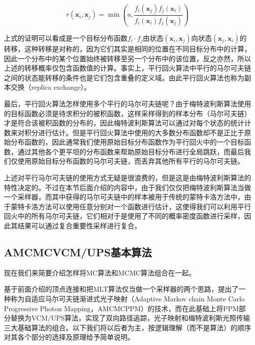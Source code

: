\begin{equation}
	r(\mathbf{x}_i,\mathbf{x}_j)=\min(a,\frac{f_i(\mathbf{x}_j)f_j(\mathbf{x}_i)}{f_i(\mathbf{x}_i)f_j(\mathbf{x}_j)})
\end{equation}

\noindent 上式的证明可以看成是一个目标分布函数$f_i\cdot f_j$由状态$(\mathbf{x}_i,\mathbf{x}_j)$向状态$(\mathbf{x}_j,\mathbf{x}_i)$的转移，这种转移是对称的，因为它们其实是相同的位置在不同目标分布中的计算，因此一个分布中的某个位置始终被转移至另一个分布中的该位置，反之亦然，所以上述的转移概率仅包含函数值的计算。事实上，平行回火算法中平行的马尔可夫链之间的状态能转移的条件也是它们包含重叠的定义域。由此平行回火算法也称为副本交换（replica exchange）。

最后，平行回火算法怎样使用多个平行的马尔可夫链呢？由于梅特波利斯算法使用的目标函数必须是待求积分的被积函数，这样采样得到的样本分布（马尔可夫链）才是符合该被积函数的分布的，因此梅特波利斯算法可以通过对每个状态的统计计数来对积分进行估计。但是平行回火算法中使用的大多数分布函数却不是正比于原始分布函数的，因此通常我们使用原始目标分布函数作为平行回火中的一个目标函数，通过其他各个更平坦的分布函数来帮助原始目标分布进行全局跳跃，而最后我们仅使用原始目标分布函数的马尔可夫链，而丢弃其他所有平行的马尔可夫链。

上述对平行马尔可夫链的使用方式无疑是很浪费的，但是这是由梅特波利斯算法的特性决定的。不过在本节后面介绍的内容中，由于我们仅仅把梅特波利斯算法当做一个采样器，而其中获得的马尔可夫链中的样本被用于传统的蒙特卡洛方法中，由于蒙特卡洛方法可以使用任意分别对一个函数进行估计，这使得我们可以利用平行回火中的所有马尔可夫链，它们相对于是使用了不同的概率密度函数进行采样，因此其结果可以通过复合重要性采样进行复合。




\subsection{AMCMCVCM/UPS基本算法}
现在我们来简要介绍怎样将MC算法和MCMC算法组合在一起。

基于前面介绍的顶点连接和把MLT算法仅当做一个采样器的两个思路，\cite{a:RobustAdaptivePhotonTracingusingPhotonPathVisibility}提出了一种称为自适应马尔可夫链渐进式光子映射（Adaptive Markov chain Monte Carlo Progressive Photon Mapping，AMCMCPPM）的技术，而\cite{a:RobustLightTransportSimulationviaMetropolisedBidirectionalEstimators}在此基础上将PPM部分替换为VCM/UPS算法，实现了双向路径追踪，光子映射和梅特波利斯光照传输三大基础算法的组合。以下我们将以后者为主，按逻辑理解（而不是算法）的顺序对其各个部分的选择及原理给予简单说明。




